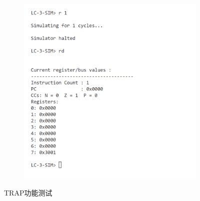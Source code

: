 \documentclass[UTF8]{ctexart}
\begin{document}
\begin{figure}[htbp]
\begin{subfigure}{0.48\textwidth}
    \includegraphics[width=\linewidth]{trap2.png}
  \end{subfigure}
  \caption{TRAP功能测试}
  \label{trap}
\end{figure}
\end{document}
